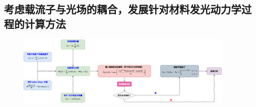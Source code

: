 \subsection{考虑载流子与光场的耦合，发展针对材料发光动力学过程的计算方法}

  \begin{figure}
    \centering
    \captionsetup{width=0.85\textwidth}
    \includegraphics[width=0.95\textwidth]{figs/namd_emission_flowchart-Page-2.pdf}
 \end{figure}


